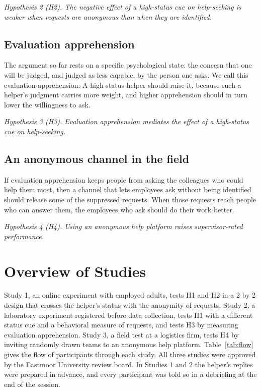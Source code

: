 \documentclass[11pt]{article}
\begin{document}
\textit{Hypothesis 2 (H2). The negative effect of a high-status cue on help-seeking is weaker when requests are anonymous than when they are identified.}

\subsection{Evaluation apprehension}

The argument so far rests on a specific psychological state: the concern that one will be judged, and judged as less capable, by the person one asks. We call this evaluation apprehension. A high-status helper should raise it, because such a helper's judgment carries more weight, and higher apprehension should in turn lower the willingness to ask.

\textit{Hypothesis 3 (H3). Evaluation apprehension mediates the effect of a high-status cue on help-seeking.}

\subsection{An anonymous channel in the field}

If evaluation apprehension keeps people from asking the colleagues who could help them most, then a channel that lets employees ask without being identified should release some of the suppressed requests. When those requests reach people who can answer them, the employees who ask should do their work better.

\textit{Hypothesis 4 (H4). Using an anonymous help platform raises supervisor-rated performance.}

\section{Overview of Studies}

Study 1, an online experiment with employed adults, tests H1 and H2 in a 2 by 2 design that crosses the helper's status with the anonymity of requests. Study 2, a laboratory experiment registered before data collection, tests H1 with a different status cue and a behavioral measure of requests, and tests H3 by measuring evaluation apprehension. Study 3, a field test at a logistics firm, tests H4 by inviting randomly drawn teams to an anonymous help platform. Table~\ref{tab:flow} gives the flow of participants through each study. All three studies were approved by the Eastmoor University review board. In Studies 1 and 2 the helper's replies were prepared in advance, and every participant was told so in a debriefing at the end of the session.
\end{document}
